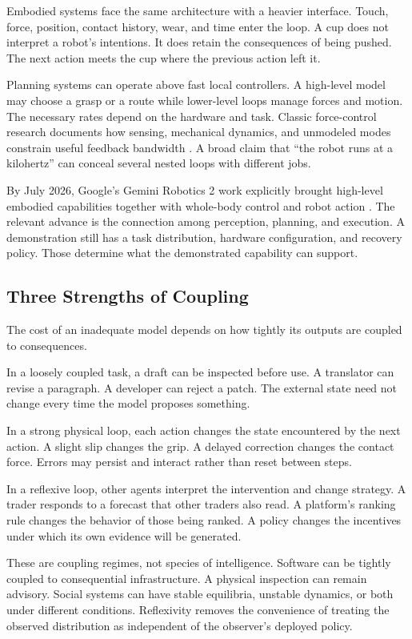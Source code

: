 Embodied systems face the same architecture with a heavier interface. Touch, force, position, contact history, wear, and time enter the loop. A cup does not interpret a robot's intentions. It does retain the consequences of being pushed. The next action meets the cup where the previous action left it.

Planning systems can operate above fast local controllers. A high-level model may choose a grasp or a route while lower-level loops manage forces and motion. The necessary rates depend on the hardware and task. Classic force-control research documents how sensing, mechanical dynamics, and unmodeled modes constrain useful feedback bandwidth \cite{eppinger1987}. A broad claim that “the robot runs at a kilohertz” can conceal several nested loops with different jobs.

By July 2026, Google's Gemini Robotics 2 work explicitly brought high-level embodied capabilities together with whole-body control and robot action \cite{geminirobotics2026}. The relevant advance is the connection among perception, planning, and execution. A demonstration still has a task distribution, hardware configuration, and recovery policy. Those determine what the demonstrated capability can support.

\subsection{Three Strengths of Coupling}

The cost of an inadequate model depends on how tightly its outputs are coupled to consequences.

In a loosely coupled task, a draft can be inspected before use. A translator can revise a paragraph. A developer can reject a patch. The external state need not change every time the model proposes something.

In a strong physical loop, each action changes the state encountered by the next action. A slight slip changes the grip. A delayed correction changes the contact force. Errors may persist and interact rather than reset between steps.

In a reflexive loop, other agents interpret the intervention and change strategy. A trader responds to a forecast that other traders also read. A platform's ranking rule changes the behavior of those being ranked. A policy changes the incentives under which its own evidence will be generated.

These are coupling regimes, not species of intelligence. Software can be tightly coupled to consequential infrastructure. A physical inspection can remain advisory. Social systems can have stable equilibria, unstable dynamics, or both under different conditions. Reflexivity removes the convenience of treating the observed distribution as independent of the observer's deployed policy.

